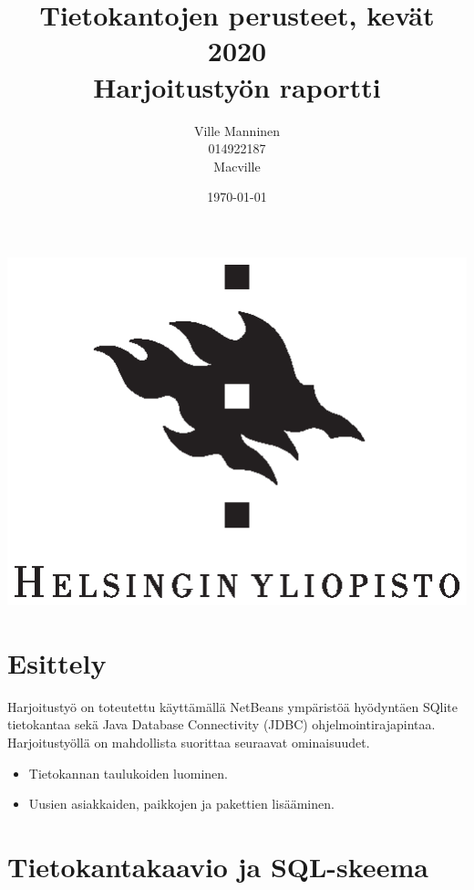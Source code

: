 \documentclass[12pt,a4paper]{article}
\begin{document}
\title{Tietokantojen perusteet, kevät 2020 \\
Harjoitustyön raportti}
\author{Ville Manninen \\014922187 \\Macville}
\date{\today}
\clearpage\maketitle
\begin{center}
\vspace{2cm}
\includegraphics{university-of-helsinki-2.eps} 
\end{center}
\thispagestyle{empty}

\newpage
\tableofcontents
\newpage
\section{Esittely}
Harjoitustyö on toteutettu käyttämällä NetBeans ympäristöä hyödyntäen SQlite tietokantaa sekä Java Database Connectivity (JDBC) ohjelmointirajapintaa. Harjoitustyöllä on mahdollista suorittaa seuraavat ominaisuudet.
\begin{itemize}
\item Tietokannan taulukoiden luominen.
\item Uusien asiakkaiden, paikkojen ja pakettien lisääminen.
\end{itemize}



\newpage
\section{Tietokantakaavio ja SQL-skeema}
\end{document}

